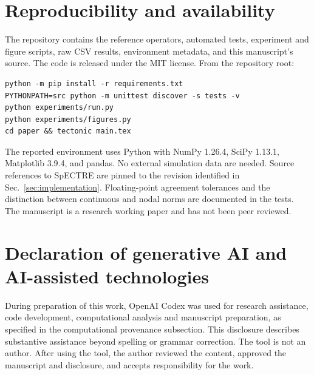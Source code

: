 \documentclass[11pt,a4paper]{article}
\theoremstyle{remark}\newtheorem{remark}[theorem]{Remark}
\begin{document}
\section*{Reproducibility and availability}
The repository contains the reference operators, automated tests,
experiment and figure scripts, raw CSV results, environment metadata,
and this manuscript's source. The code is released under the MIT license.
From the repository root:
\begin{verbatim}
python -m pip install -r requirements.txt
PYTHONPATH=src python -m unittest discover -s tests -v
python experiments/run.py
python experiments/figures.py
cd paper && tectonic main.tex
\end{verbatim}
The reported environment uses Python with NumPy 1.26.4, SciPy 1.13.1,
Matplotlib 3.9.4, and pandas. No external simulation data are needed.
Source references to SpECTRE are pinned to the revision identified in
Sec.~\ref{sec:implementation}. Floating-point agreement tolerances and
the distinction between continuous and nodal norms are documented in
the tests. The manuscript is a research working paper and has not been
peer reviewed.


\section*{Declaration of generative AI and AI-assisted technologies}
During preparation of this work, OpenAI Codex was used for research assistance,
code development, computational analysis and manuscript preparation, as
specified in the computational provenance subsection. This disclosure describes
substantive assistance beyond spelling or grammar correction. The tool is not
an author. After using the tool, the author reviewed the content, approved
the manuscript and disclosure, and accepts responsibility for the work.



\end{document}
